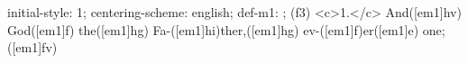 initial-style: 1;
centering-scheme: english;
def-m1: \grealign;
(f3) <c>1.</c> And([em1]hv) God([em1]f) the([em1]hg) Fa-([em1]hi)ther,([em1]hg) ev-([em1]f)er([em1]e) one;([em1]fv)